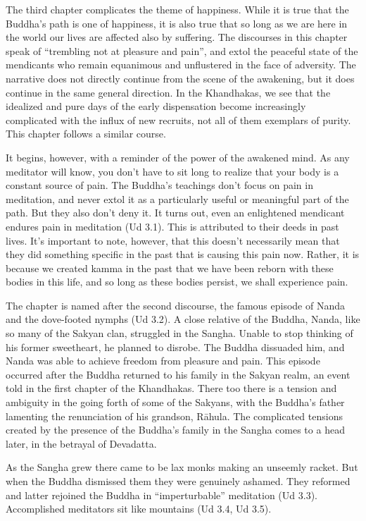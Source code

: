 \documentclass[12pt,openany]{book}%
\begin{document}
The third chapter complicates the theme of happiness. While it is true that the Buddha’s path is one of happiness, it is also true that so long as we are here in the world our lives are affected also by suffering. The discourses in this chapter speak of “trembling not at pleasure and pain”, and extol the peaceful state of the mendicants who remain equanimous and unflustered in the face of adversity. The narrative does not directly continue from the scene of the awakening, but it does continue in the same general direction. In the Khandhakas, we see that the idealized and pure days of the early dispensation become increasingly complicated with the influx of new recruits, not all of them exemplars of purity. This chapter follows a similar course.

It begins, however, with a reminder of the power of the awakened mind. As any meditator will know, you don’t have to sit long to realize that your body is a constant source of pain. The Buddha’s teachings don’t focus on pain in meditation, and never extol it as a particularly useful or meaningful part of the path. But they also don’t deny it. It turns out, even an enlightened mendicant endures pain in meditation (Ud 3.1). This is attributed to their deeds in past lives. It’s important to note, however, that this doesn’t necessarily mean that they did something specific in the past that is causing this pain now. Rather, it is because we created kamma in the past that we have been reborn with these bodies in this life, and so long as these bodies persist, we shall experience pain.

The chapter is named after the second discourse, the famous episode of Nanda and the dove-footed nymphs (Ud 3.2). A close relative of the Buddha, Nanda, like so many of the Sakyan clan, struggled in the Sangha. Unable to stop thinking of his former sweetheart, he planned to disrobe. The Buddha dissuaded him, and Nanda was able to achieve freedom from pleasure and pain. This episode occurred after the Buddha returned to his family in the Sakyan realm, an event told in the first chapter of the Khandhakas. There too there is a tension and ambiguity in the going forth of some of the Sakyans, with the Buddha’s father lamenting the renunciation of his grandson, \textsanskrit{Rāhula}. The complicated tensions created by the presence of the Buddha’s family in the Sangha comes to a head later, in the betrayal of Devadatta.

As the Sangha grew there came to be lax monks making an unseemly racket. But when the Buddha dismissed them they were genuinely ashamed. They reformed and latter rejoined the Buddha in “imperturbable” meditation (Ud 3.3). Accomplished meditators sit like mountains (Ud 3.4, Ud 3.5). 
\end{document}
